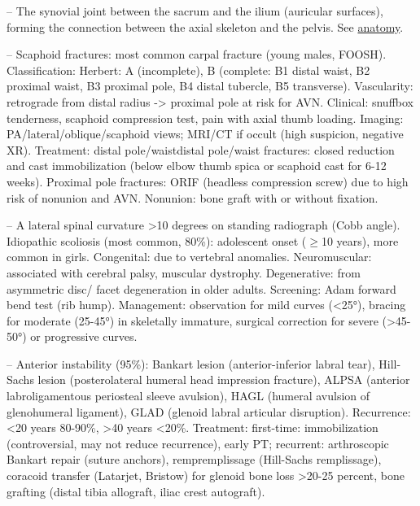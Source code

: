 -- The synovial joint between the sacrum and the ilium (auricular surfaces), forming the connection between the axial skeleton and the pelvis. See \hyperlink{Anatomy}{anatomy}.

-- Scaphoid fractures: most common carpal fracture (young males, FOOSH). Classification: Herbert: A (incomplete), B (complete: B1 distal waist, B2 proximal waist, B3 proximal pole, B4 distal tubercle, B5 transverse). Vascularity: retrograde from distal radius -> proximal pole at risk for AVN. Clinical: snuffbox tenderness, scaphoid compression test, pain with axial thumb loading. Imaging: PA/lateral/oblique/scaphoid views; MRI/CT if occult (high suspicion, negative XR). Treatment: distal pole/waistdistal pole/waist fractures: closed reduction and cast immobilization (below elbow thumb spica or scaphoid cast for 6-12 weeks). Proximal pole fractures: ORIF (headless compression screw) due to high risk of nonunion and AVN. Nonunion: bone graft with or without fixation.

-- A lateral spinal curvature >10 degrees on standing radiograph (Cobb angle). Idiopathic scoliosis (most common, 80\%): adolescent onset (\(\ge\)10 years), more common in girls. Congenital: due to vertebral anomalies. Neuromuscular: associated with cerebral palsy, muscular dystrophy. Degenerative: from asymmetric disc/ facet degeneration in older adults. Screening: Adam forward bend test (rib hump). Management: observation for mild curves (<25°), bracing for moderate (25-45°) in skeletally immature, surgical correction for severe (>45-50°) or progressive curves.

-- Anterior instability (95\%): Bankart lesion (anterior-inferior labral tear), Hill-Sachs lesion (posterolateral humeral head impression fracture), ALPSA (anterior labroligamentous periosteal sleeve avulsion), HAGL (humeral avulsion of glenohumeral ligament), GLAD (glenoid labral articular disruption). Recurrence: <20 years 80-90\%, >40 years <20\%. Treatment: first-time: immobilization (controversial, may not reduce recurrence), early PT; recurrent: arthroscopic Bankart repair (suture anchors), rempremplissage (Hill-Sachs remplissage), coracoid transfer (Latarjet, Bristow) for glenoid bone loss >20-25 percent, bone grafting (distal tibia allograft, iliac crest autograft).

